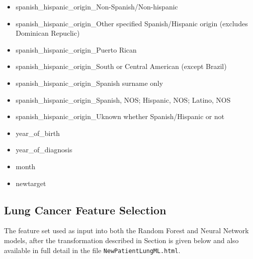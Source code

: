 \documentclass[a4paper,11pt]{article}
\newcommand{\codewhite}[1]{\colorbox{white}{\texttt{#1}}}
\begin{document}
\begin{itemize}[noitemsep]
\item spanish\_hispanic\_origin\_Non-Spanish/Non-hispanic
\item spanish\_hispanic\_origin\_Other specified Spanish/Hispanic origin (excludes Dominican Repuclic)
\item spanish\_hispanic\_origin\_Puerto Rican
\item spanish\_hispanic\_origin\_South or Central American (except Brazil)
\item spanish\_hispanic\_origin\_Spanish surname only
\item spanish\_hispanic\_origin\_Spanish, NOS; Hispanic, NOS; Latino, NOS
\item spanish\_hispanic\_origin\_Uknown whether Spanish/Hispanic or not
\item year\_of\_birth
\item year\_of\_diagnosis
\item month
\item newtarget
\end{itemize}



\subsection{Lung Cancer Feature Selection}
\label{subsec:lungfeatures}

The feature set used as input into both the Random Forest and Neural Network models, after the transformation described in Section is given below and also available in full detail in the file 
\codewhite{NewPatientLungML.html}.
\end{document}
